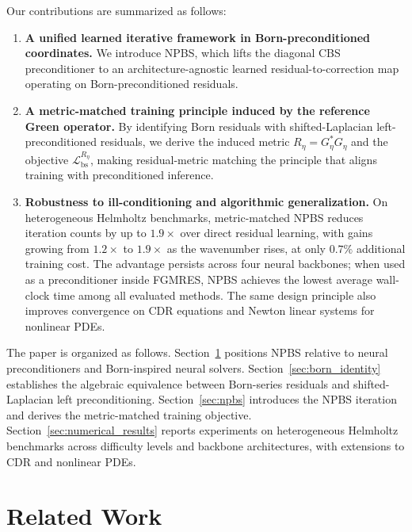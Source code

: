 \documentclass{article}
\theoremstyle{plain}
\theoremstyle{remark}
\begin{document}
Our contributions are summarized as follows:
\begin{enumerate}
\item \textbf{A unified learned iterative framework in Born-preconditioned coordinates.}
We introduce NPBS, which lifts the diagonal CBS preconditioner to an architecture-agnostic learned residual-to-correction map operating on Born-preconditioned residuals.

\item \textbf{A metric-matched training principle induced by the reference Green operator.}
By identifying Born residuals with shifted-Laplacian left-preconditioned residuals, we derive the induced metric $R_\eta = G_\eta^\ast G_\eta$ and the objective $\mathcal{L}_{\mathrm{bs}}^{R_\eta}$, making residual-metric matching the principle that aligns training with preconditioned inference.

\item \textbf{Robustness to ill-conditioning and algorithmic generalization.}
On heterogeneous Helmholtz benchmarks, metric-matched NPBS reduces iteration counts by up to $1.9\times$ over direct residual learning, with gains growing from $1.2\times$ to $1.9\times$ as the wavenumber rises, at only $0.7\%$ additional training cost. The advantage persists across four neural backbones; when used as a preconditioner inside FGMRES, NPBS achieves the lowest average wall-clock time among all evaluated methods. The same design principle also improves convergence on CDR equations and Newton linear systems for nonlinear PDEs.
\end{enumerate}

The paper is organized as follows. Section~\ref{sec:related_work} positions NPBS relative to neural preconditioners and Born-inspired neural solvers. Section~\ref{sec:born_identity} establishes the algebraic equivalence between Born-series residuals and shifted-Laplacian left preconditioning. Section~\ref{sec:npbs} introduces the NPBS iteration and derives the metric-matched training objective. Section~\ref{sec:numerical_results} reports experiments on heterogeneous Helmholtz benchmarks across difficulty levels and backbone architectures, with extensions to CDR and nonlinear PDEs.

\section{Related Work}
\label{sec:related_work}
\end{document}

